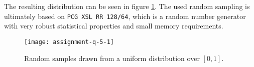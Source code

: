\documentclass[10pt, a4paper]{article}
\begin{document}
\section{}
  \subsection{}

\section{}
  \subsection{}
  The resulting distribution can be seen in figure \ref{fig:uniform}. The used random sampling
  is ultimately based on \texttt{PCG XSL RR 128/64}, which is a random number generator with
  very robust statistical properties and small memory requirements\cite{pcg}.

  \begin{figure}[h]
    \centering
    \texttt{[image: assignment-q-5-1]}
    \caption{Random samples drawn from a uniform distribution over $[0,1]$.}
    \label{fig:uniform}
  \end{figure}

{}

\end{document}
